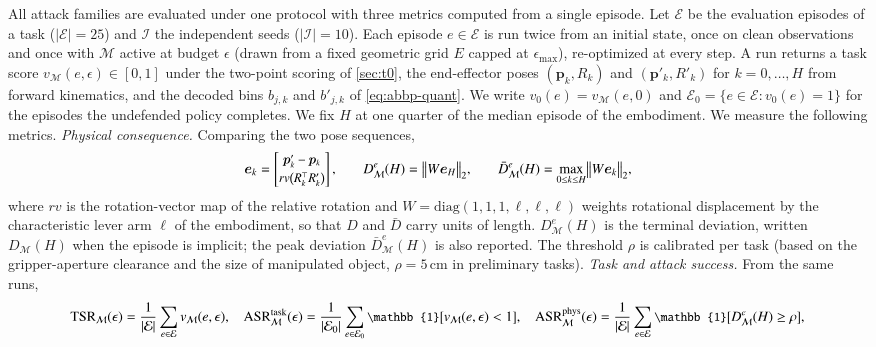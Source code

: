 \documentclass[11pt,letterpaper]{article}
\begin{document}
All attack families are evaluated under one protocol with
three metrics computed from a single episode. 
Let $\mathcal{E}$ be the evaluation episodes of a task ($|\mathcal{E}|{=}25$) and $\mathcal{I}$ the independent seeds ($|\mathcal{I}|{=}10$). Each
episode $e\in\mathcal{E}$ is run twice from an initial state, once on clean observations and once with $\mathcal{M}$ active at budget $\epsilon$ (drawn from a fixed geometric grid $E$ capped at $\epsilon_{\max}$), re-optimized at every step. 
A run returns a task score $v_{\mathcal{M}}(e,\epsilon)\in[0,1]$ under the two-point scoring of \autoref{sec:t0}, the end-effector poses $(\bm{p}_{k},R_{k})$ and $(\bm{p}'_{k},R'_{k})$ for $k=0,\dots,H$ from forward kinematics, and the decoded bins $b_{j,k}$ and $b'_{j,k}$ of \autoref{eq:abbp-quant}.
We write $v_{0}(e)=v_{\mathcal{M}}(e,0)$ and $\mathcal{E}_{0}=\{e\in\mathcal{E}:v_{0}(e)=1\}$ for the episodes the undefended policy completes. We fix $H$ at one quarter of the median episode of the embodiment. We measure the following metrics.
 \emph{Physical consequence.} Comparing the two pose sequences,
\vspace{-2ex}\begin{equation}
  \small
\bm{e}_{k}=\begin{bmatrix}\bm{p}'_{k}-\bm{p}_{k}\\[2pt] rv\bigl(R_{k}^{\top}R'_{k}\bigr)\end{bmatrix},
\qquad
D^{e}_{\mathcal{M}}(H)=\bigl\|W\bm{e}_{H}\bigr\|_{2},
\qquad
\bar{D}^{e}_{\mathcal{M}}(H)=\max_{0\le k\le H}\bigl\|W\bm{e}_{k}\bigr\|_{2},
\label{eq:abbp-gate}
\vspace{-1.5ex}\end{equation}
where $rv$ is the rotation-vector map of the relative rotation and $W=\mathrm{diag}(1,1,1, \ell,\ell,\ell)$ weights rotational displacement by the characteristic lever arm $\ell$ of the embodiment, so that $D$ and $\bar{D}$ carry units of length. $D^{e}_{\mathcal{M}}(H)$ is the terminal deviation, written $D_{\mathcal{M}}(H)$ when the episode is implicit; the peak deviation $\bar{D}^{e}_{\mathcal{M}}(H)$ is also reported. The threshold $\rho$ is calibrated per task (\ie based on the gripper-aperture clearance and the size of manipulated object, \eg $\rho{=}5$\,cm in preliminary tasks).
 \emph{Task and attack success.} From the same runs,
\vspace{-1.5ex}\begin{equation}
  \small
\mathrm{TSR}_{\mathcal{M}}(\epsilon)=\frac{1}{|\mathcal{E}|}\sum_{e\in\mathcal{E}}
v_{\mathcal{M}}(e,\epsilon),
\quad
\mathrm{ASR}^{\mathrm{task}}_{\mathcal{M}}(\epsilon)=\frac{1}{|\mathcal{E}_{0}|}
\sum_{e\in\mathcal{E}_{0}}\mathbb{1}\bigl[v_{\mathcal{M}}(e,\epsilon)<1\bigr],
\quad
\mathrm{ASR}^{\mathrm{phys}}_{\mathcal{M}}(\epsilon)=\frac{1}{|\mathcal{E}|}
\sum_{e\in\mathcal{E}}\mathbb{1}\bigl[D^{e}_{\mathcal{M}}(H)\ge\rho\bigr],
\label{eq:metric-stack}
\vspace{-1.5ex}\end{equation}
\end{document}

